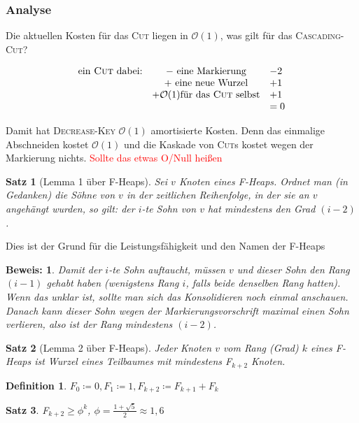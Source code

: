 \documentclass[ngerman,draft,parskip=half*,twoside]{scrreprt}
\theoremstyle{break}
\newtheorem{satz}{Satz}[chapter]
\newtheorem{definition}{Definition}[chapter]
\theoremstyle{nonumberbreak}
\newtheorem{beweis}{Beweis:}
\newcommand*{\OO}{\mathcal{O}}      %
\begin{document}
\subsubsection{Analyse}
Die aktuellen Kosten für das \textsc{Cut} liegen in $\OO(1)$, was gilt für das \textsc{Cascading-Cut}?

\[
\begin{array}{ccl}
\mbox{ein \textsc{Cut} dabei:} & - \mbox{ eine Markierung} & -2\\
 &  + \mbox{ eine neue Wurzel} & +1\\
 &  + \OO(1) \text{für das \textsc{Cut} selbst} & +1\\
 &  & =0
\end{array}\]

Damit hat \textsc{Decrease-Key} $\OO(1)$ amortisierte Kosten. Denn das einmalige Abschneiden kostet $\OO(1)$ und die Kaskade von
\textsc{Cut}s kostet wegen der Markierung nichts. \textcolor{red}{Sollte das etwas O/Null heißen}

\begin{satz}[Lemma 1 über F-Heaps]
Sei $v$ Knoten eines F-Heaps. Ordnet man (in Gedanken) die Söhne von $v$ in der zeitlichen Reihenfolge, in der sie an
$v$ angehängt wurden, so gilt: der $i$-te Sohn von $v$ hat mindestens den Grad $(i-2)$. 
\end{satz}
Dies ist der Grund für die Leistungsfähigkeit und den Namen der F-Heaps

\begin{beweis}
Damit der $i$-te Sohn auftaucht, müssen $v$ und dieser Sohn den Rang $(i-1)$ gehabt haben (wenigstens Rang $i$, falls beide
denselben Rang hatten). Wenn das unklar ist, sollte man sich das Konsolidieren noch einmal anschauen. Danach kann dieser
Sohn wegen der Markierungsvorschrift maximal einen Sohn verlieren, also ist der Rang mindestens $(i-2)$. 
\end{beweis}

\begin{satz}[Lemma 2 über F-Heaps]
Jeder Knoten $v$ vom Rang (Grad) $k$ eines F-Heaps ist Wurzel eines Teilbaumes mit mindestens F$_{k+2}$ Knoten.
\end{satz}

\begin{definition}
$F_0\coloneqq 0, F_1\coloneqq 1, F_{k+2}\coloneqq F_{k+1} +F_{k}$
\end{definition}

\begin{satz}
F$_{k+2} \geq {\phi}^k$, $\phi=\frac{1+\sqrt{5}}{2}\approx 1,6$ 
\end{satz}
\end{document}
